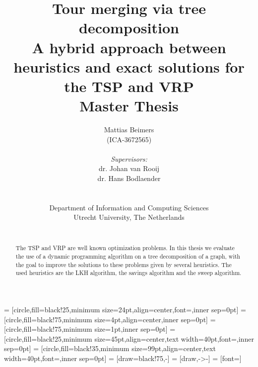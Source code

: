 \documentclass[titlepage, 12pt]{article}
\title{\huge{Tour merging via tree decomposition} \\
    \vspace{2mm}
    \small{A hybrid approach between heuristics and exact solutions for the TSP and VRP} \\
    \vspace{2mm}
    \large{Master Thesis}
}
\author{Mattias Beimers \\
    (ICA-3672565) \\
    \\
    \emph{Supervisors:} \\
    dr. Johan van Rooij \\
    dr. Hans Bodlaender \\
    \\
    \\
    Department of Information and Computing Sciences \\
    Utrecht University, The Netherlands \\
    \\
}
\begin{document}
 = [circle,fill=black!25,minimum size=24pt,align=center,font=\small,inner sep=0pt]
 = [circle,fill=black!75,minimum size=4pt,align=center,inner sep=0pt]
 = [circle,fill=black!75,minimum size=1pt,inner sep=0pt]
 = [circle,fill=black!25,minimum size=45pt,align=center,text width=40pt,font=\small,inner sep=0pt]
 = [circle,fill=black!35,minimum size=99pt,align=center,text width=40pt,font=\small,inner sep=0pt]
 = [draw=black!75,-]
 = [draw,->-]
 = [font=\small]

\maketitle

%
%
%

%
%
\begin{abstract}
    The TSP and VRP are well known optimization problems.
    In this thesis we evaluate the use of a dynamic programming algorithm on a tree decomposition of a
    graph, with the goal to improve the solutions to these problems given by several heuristics. The
    used heuristics are the LKH algorithm, the savings algorithm and the sweep algorithm.
\end{abstract}



%
%
\end{document}
